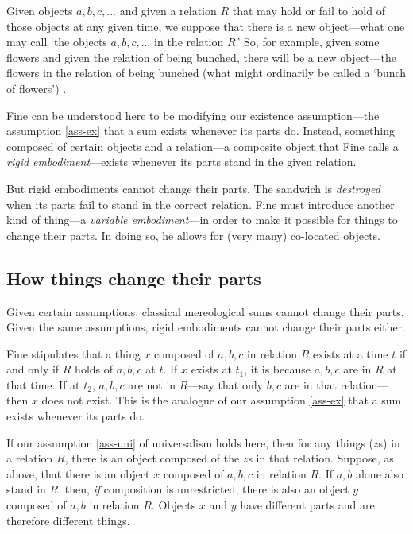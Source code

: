 \documentclass[12pt,twoside]{reedfancy}
\newenvironment{squote}{%
	\begin{spacing}{1}
	\begin{list}{}{%
	\setlength{\labelwidth}{0pt}%
	\rightmargin\leftmargin%
	}
	\item\relax
	}{%
	\end{list}%
	\end{spacing}
	}
\begin{document}
\begin{spacing}{1.25}
\begin{squote}
Given objects $a, b, c, ... $ and given a relation $R$ that
may hold or fail to hold of those objects at any given time, we
suppose that there is a new object---what one may call `the objects
$a, b, c, ... $ in the relation $R$.'  So, for example,
given some flowers and given the relation of being bunched, there will
be a new object---the flowers in the relation of being bunched (what
might ordinarily be called a `bunch of flowers')
\citeyearpar[65]{fine1999}.
\end{squote}

Fine can be understood here to be modifying our existence
assumption---the assumption \ref{ass-ex} that a sum exists whenever
its parts do.  Instead, something composed of certain objects and a
relation---a composite object that Fine calls a {\em rigid
  embodiment}---exists whenever its parts stand in the given relation.

But rigid embodiments cannot change their parts.  The sandwich is {\em
  destroyed} when its parts fail to stand in the correct relation.
Fine must introduce another kind of thing---a {\em variable
  embodiment}---in order to make it possible for things to change
their parts.  In doing so, he allows for (very many) co-located
objects.

\subsection{How things change their parts}
\label{h-part}
Given certain assumptions, classical mereological sums cannot change
their parts.  Given the same assumptions, rigid embodiments cannot
change their parts either.

Fine stipulates that a thing $x$ composed of $a, b, c$ in relation $R$
exists at a time $t$ if and only if $R$ holds of $a, b, c$ at $t$.  If
$x$ exists at $t_1$, it is because $a, b, c$ are in $R$ at that time.
If at $t_2$, $a, b, c$ are not in $R$---say that only $b, c$ are in
that relation---then $x$ does not exist.  This is the analogue of our
assumption \ref{ass-ex} that a sum exists whenever its parts do.

If our assumption \ref{ass-uni} of universalism holds here, then for
any things ($z$s) in a relation $R$, there is an object composed of
the $z$s in that relation.  Suppose, as above, that there is an object
$x$ composed of $a, b, c$ in relation $R$.  If $a, b$ alone also stand
in $R$, then, {\em if} composition is unrestricted, there is also an
object $y$ composed of $a, b$ in relation $R$.  Objects $x$ and $y$
have different parts and are therefore different things.


\end{spacing}
\end{document}
